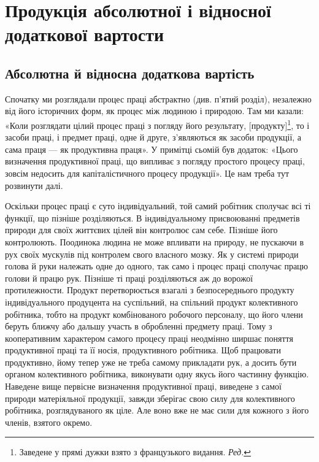 \chapter{Продукція абсолютної і відносної додаткової вартости}

\section{Абсолютна й відносна додаткова вартість}

Спочатку ми розглядали процес праці абстрактно (див. п’ятий
розділ), незалежно від його історичних форм, як процес між
людиною і природою. Там ми казали: «Коли розглядати цілий
процес праці з погляду його результату, [продукту]\footnote*{
Заведене у прямі дужки взято з французького видання. \emph{Ред.}
}, то і засоби
праці, і предмет праці, одне й друге, з’являються як засоби
продукції, а сама праця — як продуктивна праця». У примітці
сьомій був додаток: «Цього визначення продуктивної праці,
що випливає з погляду простого процесу праці, зовсім недосить
для капіталістичного процесу продукції». Це нам треба тут
розвинути далі.

Оскільки процес праці є суто індивідуальний, той самий
робітник сполучає всі ті функції, що пізніше розділяються. В індивідуальному
присвоюванні предметів природи для своїх життєвих
цілей він контролює сам себе. Пізніше його контролюють.
Поодинока людина не може впливати на природу, не пускаючи
в рух своїх мускулів під контролем свого власного мозку. Як у
системі природи голова й руки належать одне до одного, так само
і процес праці сполучає працю голови й працю рук. Пізніше ті
праці розділяються аж до ворожої протилежности. Продукт перетворюється
взагалі з безпосереднього продукту індивідуального
продуцента на суспільний, на спільний продукт колективного
робітника, тобто на продукт комбінованого робочого персоналу,
що його члени беруть ближчу або дальшу участь в обробленні
предмету праці. Тому з кооперативним характером самого процесу
праці неодмінно ширшає поняття продуктивної праці та
її носія, продуктивного робітника. Щоб працювати продуктивно,
йому тепер уже не треба самому прикладати рук, а досить бути
органом колективного робітника, виконувати одну якусь його
частинну функцію. Наведене вище первісне визначення продуктивної
праці, виведене з самої природи матеріяльної продукції,
завжди зберігає свою силу для колективного робітника, розглядуваного
як ціле. Але воно вже не має сили для кожного з його
членів, взятого окремо.

